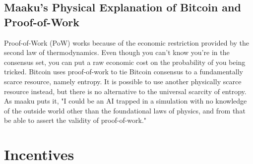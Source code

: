 \documentclass[letterpaper]{article}
\begin{document}
\subsection{Maaku's Physical Explanation of Bitcoin and Proof-of-Work}

Proof-of-Work (PoW) works because of the economic restriction provided by the
second law of thermodynamics. Even though you can't know you're in the
consensus set, you can put a raw economic cost on the probability of you being
tricked.  Bitcoin uses proof-of-work to tie Bitcoin consensus to a
fundamentally scarce resource, namely entropy. It is possible to use another
physically scarce resource instead, but there is no alternative to the
universal scarcity of entropy. As maaku puts it, "I could be an AI trapped in a
simulation with no knowledge of the outside world other than the foundational
laws of physics, and from that be able to assert the validity of
proof-of-work."

\section{Incentives}
\end{document}
